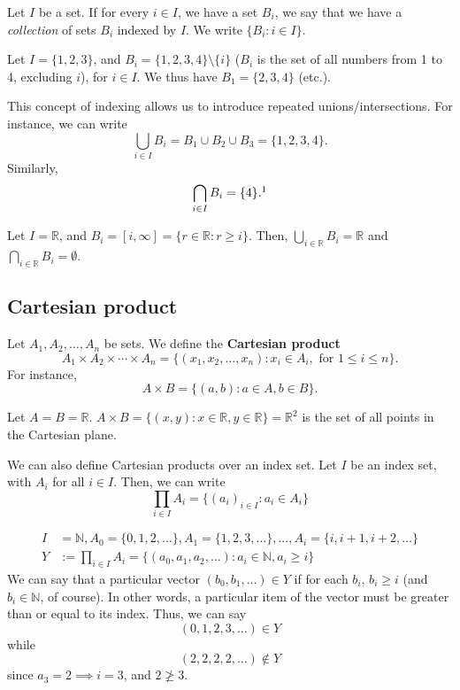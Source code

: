 \documentclass[12pt,oneside]{article}
\begin{document}
Let $I$ be a set. If for every $i \in I$, we have a set $B_i$, we say that we have a \textit{collection} of sets $B_i$ indexed by $I$. We write $\{B_i : i \in I\}$.

\begin{example}
  Let $I = \{1, 2, 3\}$, and $B_i = \{1,2,3,4\}\setminus \{i\}$ ($B_i$ is the set of all numbers from 1 to 4, excluding $i$), for $i \in I$. We thus have $B_1 = \{2, 3, 4\}$ (etc.).

  This concept of indexing allows us to introduce repeated unions/intersections. For instance, we can write \[\bigcup_{i \in I} B_i = B_1 \cup B_2 \cup B_3 = \{1,2,3,4\}.\]
  Similarly, \[\bigcap_{i \in I} B_i = \{4\}.\footnotemark\]
\end{example}

\begin{example}
  Let $I = \mathbb{R}$, and $B_i = [i, \infty] = \{r \in \mathbb{R} : r \geq i\}$. Then, $\bigcup_{i \in \mathbb{R}} B_i = \mathbb{R}$ and $\bigcap_{i \in \mathbb{R}} B_i = \emptyset$.
\end{example}

\subsection{Cartesian product}

Let $A_1, A_2, \dots, A_n$ be sets. We define the \textbf{Cartesian product} \[A_1 \times A_2 \times \cdots \times A_n = \{(x_1, x_2, \dots, x_n) : x_i \in A_i, \text{ for } 1 \leq i \leq n\}.\] For instance, \[A \times B = \{(a, b) : a \in A, b \in B\}.\]

\begin{example}
  Let $A = B = \mathbb{R}$. $A \times B = \{(x,y) : x \in \mathbb{R}, y \in \mathbb{R} \} = \mathbb{R}^2$ is the set of all points in the Cartesian plane.
\end{example}

We can also define Cartesian products over an index set. Let $I$ be an index set, with $A_i$ for all $i \in I$. Then, we can write \[\prod_{i \in I}A_i = \{(a_i)_{i \in I} : a_i \in A_i\}\]

\begin{example}
  \begin{align*}
    I &= \mathbb{N}, A_0 = \{0, 1, 2, \dots\}, A_1 = \{1, 2, 3, \dots\}, ... , A_i = \{i, i+1, i+2, \dots \}\\
  Y &:= \prod_{i \in I}A_i = \{(a_0, a_1, a_2, \dots):a_i \in \mathbb{N}, a_i \geq i\}
  \end{align*}
  We can say that a particular vector $(b_0, b_1, \dots) \in Y$ if for each $b_i$, $b_i \geq i$ (and $b_i \in \mathbb{N}$, of course). In other words, a particular item of the vector must be greater than or equal to its index. Thus, we can say \[(0, 1, 2, 3, \dots) \in Y\] while \[(2,2,2, 2, \dots) \notin Y\] since $a_3 = 2 \implies i = 3$, and $2 \ngeq 3$.
\end{example}
\end{document}
